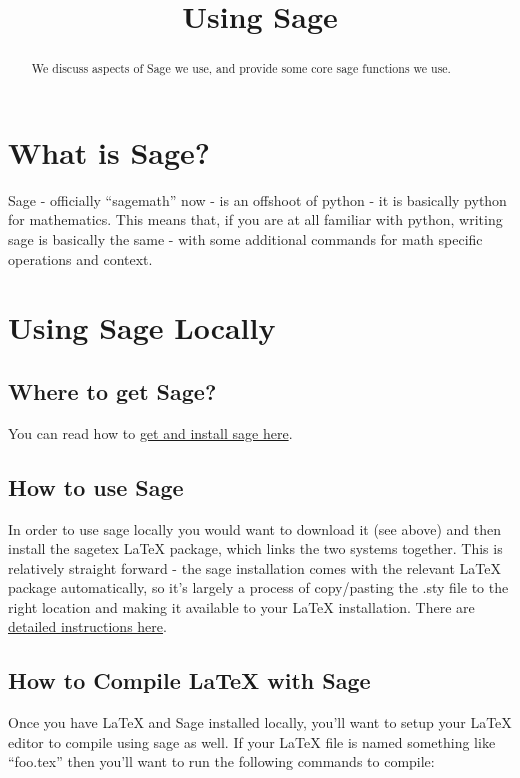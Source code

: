 \documentclass{ximera}
\title{Using Sage}
\begin{document}
\begin{abstract}
    We discuss aspects of Sage we use, and provide some core sage functions we use.
\end{abstract}
\maketitle

\section{What is Sage?}
    Sage - officially ``sagemath'' now - is an offshoot of python - it is basically python for mathematics. This means that, if you are at all familiar with python, writing sage is basically the same - with some additional commands for math specific operations and context.

\section{Using Sage Locally}
    \subsection{Where to get Sage?}
        You can read how to \href{https://www.sagemath.org/download.html}{get and install sage here}. 
    
    \subsection{How to use Sage}
        In order to use sage locally you would want to download it (see above) and then install the sagetex LaTeX package, which links the two systems together. This is relatively straight forward - the sage installation comes with the relevant LaTeX package automatically, so it's largely a process of copy/pasting the .sty file to the right location and making it available to your LaTeX installation. There are \href{https://doc.sagemath.org/html/en/reference/misc/sagetex.html}{detailed instructions here}.
    
    \subsection{How to Compile LaTeX with Sage}
        Once you have LaTeX and Sage installed locally, you'll want to setup your LaTeX editor to compile using sage as well. If your LaTeX file is named something like ``foo.tex'' then you'll want to run the following commands to compile:
        
\end{document}
